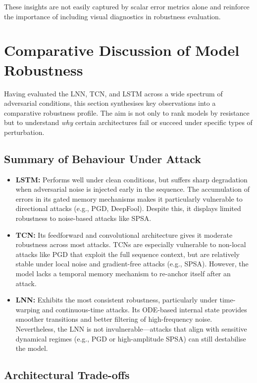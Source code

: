 These insights are not easily captured by scalar error metrics alone and reinforce the importance of including visual diagnostics in robustness evaluation.

\section{Comparative Discussion of Model Robustness}

Having evaluated the LNN, TCN, and LSTM across a wide spectrum of adversarial conditions, this section synthesises key observations into a comparative robustness profile. The aim is not only to rank models by resistance but to understand \emph{why} certain architectures fail or succeed under specific types of perturbation.

\subsection{Summary of Behaviour Under Attack}

\begin{itemize}
    \item \textbf{LSTM:} Performs well under clean conditions, but suffers sharp degradation when adversarial noise is injected early in the sequence. The accumulation of errors in its gated memory mechanisms makes it particularly vulnerable to directional attacks (e.g., PGD, DeepFool). Despite this, it displays limited robustness to noise-based attacks like SPSA.
    
    \item \textbf{TCN:} Its feedforward and convolutional architecture gives it moderate robustness across most attacks. TCNs are especially vulnerable to non-local attacks like PGD that exploit the full sequence context, but are relatively stable under local noise and gradient-free attacks (e.g., SPSA). However, the model lacks a temporal memory mechanism to re-anchor itself after an attack.

    \item \textbf{LNN:} Exhibits the most consistent robustness, particularly under time-warping and continuous-time attacks. Its ODE-based internal state provides smoother transitions and better filtering of high-frequency noise. Nevertheless, the LNN is not invulnerable—attacks that align with sensitive dynamical regimes (e.g., PGD or high-amplitude SPSA) can still destabilise the model.
\end{itemize}

\subsection{Architectural Trade-offs}

